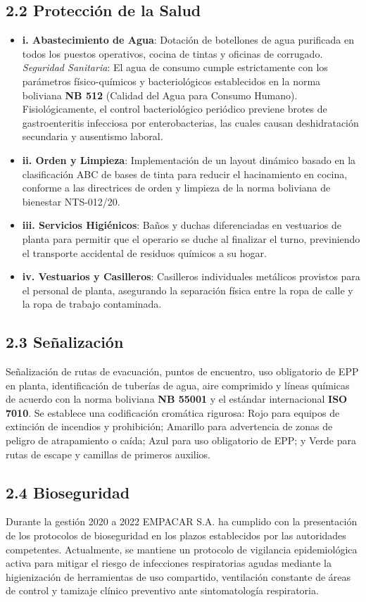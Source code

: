 \documentclass[11pt, letterpaper]{article}
\begin{document}
\subsection{2.2 Protección de la Salud}
\begin{itemize}
    \item \textbf{i. Abastecimiento de Agua}: Dotación de botellones de agua purificada en todos los puestos operativos, cocina de tintas y oficinas de corrugado. \textit{Seguridad Sanitaria}: El agua de consumo cumple estrictamente con los parámetros físico-químicos y bacteriológicos establecidos en la norma boliviana \textbf{NB 512} (Calidad del Agua para Consumo Humano). Fisiológicamente, el control bacteriológico periódico previene brotes de gastroenteritis infecciosa por enterobacterias, las cuales causan deshidratación secundaria y ausentismo laboral.
    \item \textbf{ii. Orden y Limpieza}: Implementación de un layout dinámico basado en la clasificación ABC de bases de tinta para reducir el hacinamiento en cocina, conforme a las directrices de orden y limpieza de la norma boliviana de bienestar NTS-012/20.
    \item \textbf{iii. Servicios Higiénicos}: Baños y duchas diferenciadas en vestuarios de planta para permitir que el operario se duche al finalizar el turno, previniendo el transporte accidental de residuos químicos a su hogar.
    \item \textbf{iv. Vestuarios y Casilleros}: Casilleros individuales metálicos provistos para el personal de planta, asegurando la separación física entre la ropa de calle y la ropa de trabajo contaminada.
\end{itemize}

\subsection{2.3 Señalización}
Señalización de rutas de evacuación, puntos de encuentro, uso obligatorio de EPP en planta, identificación de tuberías de agua, aire comprimido y líneas químicas de acuerdo con la norma boliviana \textbf{NB 55001} y el estándar internacional \textbf{ISO 7010}. Se establece una codificación cromática rigurosa: Rojo para equipos de extinción de incendios y prohibición; Amarillo para advertencia de zonas de peligro de atrapamiento o caída; Azul para uso obligatorio de EPP; y Verde para rutas de escape y camillas de primeros auxilios.

\subsection{2.4 Bioseguridad}
Durante la gestión 2020 a 2022 EMPACAR S.A. ha cumplido con la presentación de los protocolos de bioseguridad en los plazos establecidos por las autoridades competentes. Actualmente, se mantiene un protocolo de vigilancia epidemiológica activa para mitigar el riesgo de infecciones respiratorias agudas mediante la higienización de herramientas de uso compartido, ventilación constante de áreas de control y tamizaje clínico preventivo ante sintomatología respiratoria.
\end{document}
